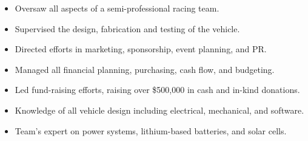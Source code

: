 \begin{entrylist}
{\begin{itemize}[leftmargin=12pt]
    \item Oversaw all aspects of a semi-professional racing team.
    \item Supervised the design, fabrication and testing of the vehicle.
    \item Directed efforts in marketing, sponsorship, event planning, and PR.
    \item Managed all financial planning, purchasing, cash flow, and budgeting.
    \item Led fund-raising efforts, raising over \$500,000 in cash and in-kind donations.
    \item Knowledge of all vehicle design including electrical, mechanical, and software.
    \item Team’s expert on power systems, lithium-based batteries, and solar cells.
  \end{itemize}
}
\end{entrylist}